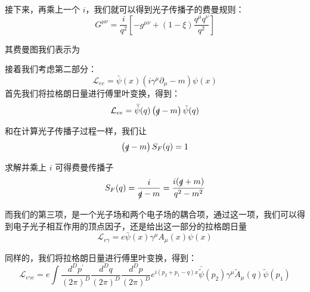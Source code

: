 \documentclass{article}
\begin{document}
接下来，再乘上一个 $i$，我们就可以得到光子传播子的费曼规则：
\begin{equation}
    G^{\mu\nu} = \frac{i}{q^2}\left[-g^{\mu\nu} + \left(1 - \xi\right)\frac{q^{\mu}q^{\nu}}{q^2}\right]
\end{equation}

其费曼图我们表示为
\begin{center}
\end{center}

接着我们考虑第二部分：
\begin{equation}
    \mathcal{L}_{ee} = \bar{\psi}(x)\left(i\gamma^{\mu}\partial_{\mu} - m\right)\psi(x)
\end{equation}
首先我们将拉格朗日量进行傅里叶变换，得到：
\begin{equation}
    \mathcal{L}_{ee} = \bar{\tilde{\psi}}(q)\left(\slashed{q} - m\right)\tilde{\psi}(q)
\end{equation}

和在计算光子传播子过程一样，我们让
\begin{equation}
    \left(\slashed{q} - m\right)S_F(q) = 1
\end{equation}

求解并乘上 $i$ 可得费曼传播子
\begin{equation}
    S_F(q) = \frac{i}{\slashed{q} - m} = \frac{i(\slashed{q} + m)}{q^2 - m^2}
\end{equation}

而我们的第三项，是一个光子场和两个电子场的耦合项，通过这一项，我们可以得到电子光子相互作用的顶点因子，还是给出这一部分的拉格朗日量
\begin{equation}
    \mathcal{L}_{e\gamma} = e\bar{\psi}(x)\gamma^{\mu}A_{\mu}(x)\psi(x)
\end{equation}

同样的，我们将拉格朗日量进行傅里叶变换，得到：
\begin{equation}
    \mathcal{L}_{e\gamma e} = e\int \frac{d^D p^\prime}{(2\pi)^D} \frac{d^D q}{(2\pi)^D} \frac{d^D p}{(2\pi)^D} e^{i(p_2 + p_1 - q)x} \bar{\tilde{\psi}}(p_2)\gamma^{\mu}\tilde{A}_{\mu}(q)\tilde{\psi}(p_1)
\end{equation}
\end{document}
